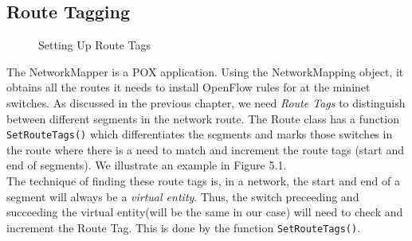 \subsection{Route Tagging}
\begin{figure}
	\noindent
	\caption{Setting Up Route Tags}
\end{figure}
The NetworkMapper is a POX application. Using the NetworkMapping object, it obtains all the routes it needs to install OpenFlow rules for at the mininet switches. As discussed in the previous chapter, we need \emph{Route Tags} to distinguish between different segments in the network route. The Route class has a function \verb|SetRouteTags()| which differentiates the segments and marks those switches in the route where there is a need to match and increment the route tags (start and end of segments). We illustrate an example in Figure 5.1. \\
The technique of finding these route tags is, in a network, the start and end of a segment will always be a \emph{virtual entity}. Thus, the switch preceeding and succeeding the virtual entity(will be the same in our case) will need to check and increment the Route Tag. This is done by the function \verb|SetRouteTags()|. 

